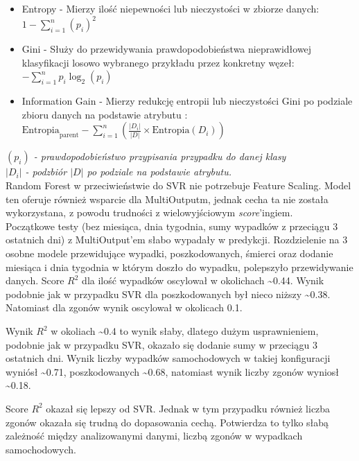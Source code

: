 \documentclass{article}
\begin{document}
\begin{itemize}
         \item Entropy - Mierzy ilość niepewności lub nieczystości w zbiorze danych: \(1 - \sum_{i=1}^{n} (p_i)^2\)
         \item Gini - Służy do przewidywania prawdopodobieństwa nieprawidłowej klasyfikacji losowo wybranego przykładu przez konkretny węzeł: \(-\sum_{i=1}^{n} p_i \log_2 (p_i)\)
         \item Information Gain - Mierzy redukcję entropii lub nieczystości Gini po podziale zbioru danych na podstawie atrybutu : \( \text{Entropia}_{\text{parent}} - \sum_{i=1}^{n} \left( \frac{|D_i|}{|D|} \times \text{Entropia}(D_i) \right)\) 
\end{itemize}
\textit{\((p_i)\) - prawdopodobieństwo przypisania przypadku do danej klasy\\ \(|D_i|\) - podzbiór \(|D|\) po podziale na podstawie atrybutu.}\\

Random Forest w przeciwieństwie do SVR nie potrzebuje Feature Scaling. Model ten oferuje również wsparcie dla MultiOutputm, jednak cecha ta nie została wykorzystana, z powodu trudności z wielowyjściowym \textit{score}'ingiem.\\

Początkowe testy (bez miesiąca, dnia tygodnia, sumy wypadków z przeciągu 3 ostatnich dni) z MultiOutput'em słabo wypadały w predykcji. 
Rozdzielenie na 3 osobne modele przewidujące wypadki, poszkodowanych, śmierci oraz dodanie miesiąca i dnia tygodnia w którym doszło do wypadku, polepszyło przewidywanie danych. 
Score \(R^2\) dla ilość wypadków oscylował w okolichach \textasciitilde 0.44. Wynik podobnie jak w przypadku SVR dla poszkodowanych był nieco niższy \textasciitilde 0.38. 
Natomiast dla zgonów wynik oscylował w okolicach 0.1. 

Wynik \(R^2\) w okoliach \textasciitilde0.4 to wynik słaby, dlatego dużym usprawnieniem, podobnie jak w przypadku SVR, okazało się dodanie sumy w przeciągu 3 ostatnich dni. Wynik liczby wypadków samochodowych w takiej konfiguracji wyniósł \textasciitilde 0.71, poszkodowanych \textasciitilde 0.68, natomiast wynik liczby zgonów wyniosł \textasciitilde 0.18.

Score \(R^2\) okazał się lepszy od SVR. Jednak w tym przypadku również liczba zgonów okazała się trudną do dopasowania cechą.
Potwierdza to tylko słabą zależność między analizowanymi danymi, liczbą zgonów w wypadkach samochodowych.\\
\end{document}
